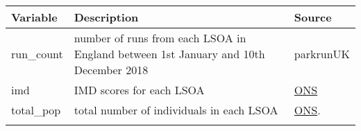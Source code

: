 \documentclass[]{article}
\begin{document}
\begin{longtable}[]{@{}lll@{}}
\toprule
\begin{minipage}[b]{0.22\columnwidth}\raggedright
Variable\strut
\end{minipage} & \begin{minipage}[b]{0.33\columnwidth}\raggedright
Description\strut
\end{minipage} & \begin{minipage}[b]{0.37\columnwidth}\raggedright
Source\strut
\end{minipage}\tabularnewline
\midrule
\endhead
\begin{minipage}[t]{0.22\columnwidth}\raggedright
run\_count\strut
\end{minipage} & \begin{minipage}[t]{0.33\columnwidth}\raggedright
number of runs from each LSOA in England between 1st January and 10th
December 2018\strut
\end{minipage} & \begin{minipage}[t]{0.37\columnwidth}\raggedright
parkrunUK\strut
\end{minipage}\tabularnewline
\begin{minipage}[t]{0.22\columnwidth}\raggedright
imd\strut
\end{minipage} & \begin{minipage}[t]{0.33\columnwidth}\raggedright
IMD scores for each LSOA\strut
\end{minipage} & \begin{minipage}[t]{0.37\columnwidth}\raggedright
\href{https://assets.publishing.service.gov.uk/government/uploads/system/uploads/attachment_data/file/835115/IoD2019_Statistical_Release.pdf}{ONS}\strut
\end{minipage}\tabularnewline
\begin{minipage}[t]{0.22\columnwidth}\raggedright
total\_pop\strut
\end{minipage} & \begin{minipage}[t]{0.33\columnwidth}\raggedright
total number of individuals in each LSOA\strut
\end{minipage} & \begin{minipage}[t]{0.37\columnwidth}\raggedright
\href{https://www.ons.gov.uk/peoplepopulationandcommunity/populationandmigration/populationestimates/datasets/lowersuperoutputareamidyearpopulationestimates}{ONS}.\strut
\end{minipage}\tabularnewline
\begin{minipage}[t]{0.22\columnwidth}\raggedright

\end{minipage}
\end{longtable}
\end{document}
